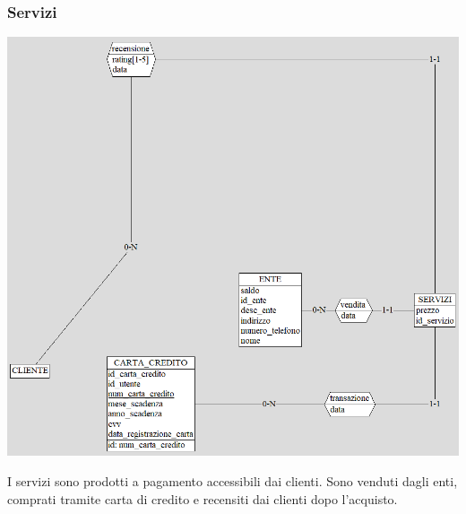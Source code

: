 \subsubsection{Servizi}
\begin{center}
\includegraphics[width=0.95\columnwidth]{images/Servizi.png}
\end{center}
I servizi sono prodotti a pagamento accessibili dai clienti.
Sono venduti dagli enti, comprati tramite carta di credito e recensiti dai clienti dopo l'acquisto.


